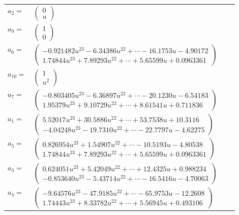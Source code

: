 \documentclass[1p]{elsarticle_modified}
\theoremstyle{definition}
\begin{document}
\begin{tabular}{m{7pt} m{180pt} m{7pt} m{180pt} }
\flushright $a_{2}=$&$\begin{pmatrix}0\\u\end{pmatrix}$ \\
\flushright $a_{9}=$&$\begin{pmatrix}1\\0\end{pmatrix}$ \\
\flushright $a_{6}=$&$\begin{pmatrix}-0.921482 u^{23}-6.34386 u^{22}+\cdots-16.1753 u-4.90172\\1.74844 u^{23}+7.89293 u^{22}+\cdots+5.65599 u+0.0963361\end{pmatrix}$ \\
\flushright $a_{10}=$&$\begin{pmatrix}1\\u^2\end{pmatrix}$ \\
\flushright $a_{7}=$&$\begin{pmatrix}-0.803405 u^{23}-6.36897 u^{22}+\cdots-20.1230 u-6.54183\\1.95379 u^{23}+9.10729 u^{22}+\cdots+8.61541 u+0.711836\end{pmatrix}$ \\
\flushright $a_{1}=$&$\begin{pmatrix}5.52017 u^{23}+30.5886 u^{22}+\cdots+53.7538 u+10.3116\\-4.04248 u^{23}-19.7310 u^{22}+\cdots-22.7797 u-4.62275\end{pmatrix}$ \\
\flushright $a_{5}=$&$\begin{pmatrix}0.826954 u^{23}+1.54907 u^{22}+\cdots-10.5193 u-4.80538\\1.74844 u^{23}+7.89293 u^{22}+\cdots+5.65599 u+0.0963361\end{pmatrix}$ \\
\flushright $a_{3}=$&$\begin{pmatrix}0.624051 u^{23}+5.42049 u^{22}+\cdots+12.4325 u+0.988234\\-0.853640 u^{23}-5.43714 u^{22}+\cdots-16.5416 u-4.70063\end{pmatrix}$ \\
\flushright $a_{4}=$&$\begin{pmatrix}-9.64576 u^{23}-47.9185 u^{22}+\cdots-65.9753 u-12.2608\\1.74443 u^{23}+8.33782 u^{22}+\cdots+5.56945 u+0.493106\end{pmatrix}$ \\

\end{tabular}
\end{document}
